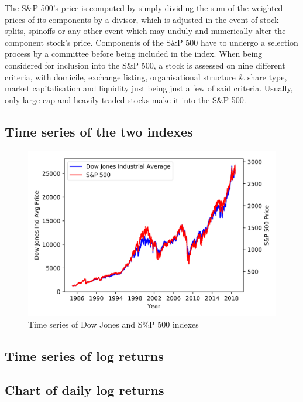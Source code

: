 \documentclass[a4paper]{article}
\begin{document}
The S\&P 500’s price is computed by simply dividing the sum of the weighted prices of its components by a divisor, which is adjusted in the event of stock splits, spinoffs or any other event which may unduly and numerically alter the component stock’s price. Components of the S\&P 500 have to undergo a selection process by a committee before being included in the index.  When being considered for inclusion into the S\&P 500, a stock is assessed on nine different criteria, with domicile, exchange listing, organisational structure \& share type, market capitalisation and liquidity just being just a few of said criteria. Usually, only large cap and heavily traded stocks make it into the S\&P 500.


\subsection{Time series of the two indexes}

\begin{figure}[h]
	\includegraphics[width=\linewidth]{time_series.png}
	\caption{Time series of Dow Jones and S\%P 500 indexes}
\end{figure}

\subsection{Time series of log returns}

\newpage
\subsection{Chart of daily log returns}
\end{document}
